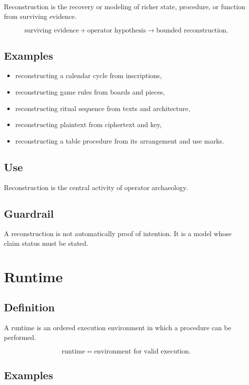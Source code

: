 \documentclass[11pt]{book}
\begin{document}
Reconstruction is the recovery or modeling of richer state, procedure, or function from surviving evidence.

\[
\text{surviving evidence} + \text{operator hypothesis} \rightarrow \text{bounded reconstruction}.
\]

\subsection*{Examples}

\begin{itemize}
    \item reconstructing a calendar cycle from inscriptions,
    \item reconstructing game rules from boards and pieces,
    \item reconstructing ritual sequence from texts and architecture,
    \item reconstructing plaintext from ciphertext and key,
    \item reconstructing a table procedure from its arrangement and use marks.
\end{itemize}

\subsection*{Use}

Reconstruction is the central activity of operator archaeology.

\subsection*{Guardrail}

A reconstruction is not automatically proof of intention. It is a model whose claim status must be stated.

\section{Runtime}

\subsection*{Definition}

A runtime is an ordered execution environment in which a procedure can be performed.

\[
\text{runtime} = \text{environment for valid execution}.
\]

\subsection*{Examples}
\end{document}

